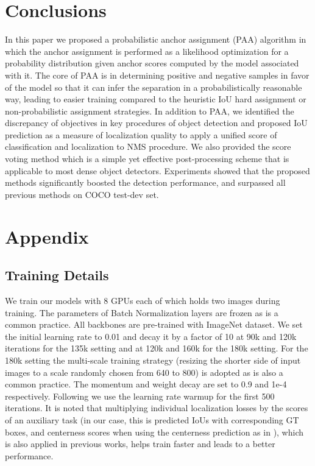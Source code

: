 \documentclass[runningheads]{llncs}
\begin{document}
\section{Conclusions}
In this paper we proposed a probabilistic anchor assignment (PAA) algorithm in which the anchor assignment is performed as a likelihood optimization for a probability distribution given anchor scores computed by the model associated with it. The core of PAA is in determining positive and negative samples in favor of the model so that it can infer the separation in a probabilistically reasonable way, leading to easier training compared to the heuristic IoU hard assignment or non-probabilistic assignment strategies. In addition to PAA, we identified the discrepancy of objectives in key procedures of object detection and proposed IoU prediction as a measure of localization quality to apply a unified score of classification and localization to NMS procedure. We also provided the score voting method which is a simple yet effective post-processing scheme that is applicable to most dense object detectors. Experiments showed that the proposed methods significantly boosted the detection performance, and surpassed all previous methods on COCO test-dev set.

\clearpage


\clearpage

\newpage
\section{Appendix}

\subsection{Training Details}
We train our models with 8 GPUs each of which holds two images during training. The parameters of Batch Normalization layers\cite{batchnorm} are frozen as is a common practice. All backbones are pre-trained with ImageNet dataset\cite{imagenet}. We set the initial learning rate to 0.01 and decay it by a factor of 10 at 90k and 120k iterations for the 135k setting and at 120k and 160k for the 180k setting. For the 180k setting the multi-scale training strategy (resizing the shorter side of input images to a scale randomly chosen from 640 to 800) is adopted as is also a common practice. The momentum and weight decay are set to 0.9 and 1e-4 respectively. Following \cite{imagenet1hour} we use the learning rate warmup for the first 500 iterations. It is noted that multiplying individual localization losses by the scores of an auxiliary task (in our case, this is predicted IoUs with corresponding GT boxes, and centerness scores when using the centerness prediction as in \cite{fcos, atss}), which is also applied in previous works\cite{fcos, atss}, helps train faster and leads to a better performance.
\end{document}
